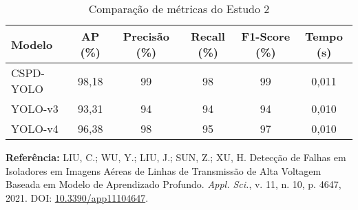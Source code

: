 \begin{table}[h]
    \centering
    \caption{Comparação de métricas do Estudo 2}
    \begin{tabular}{lccccc}
        \hline
        \textbf{Modelo} & \textbf{AP (\%)} & \textbf{Precisão (\%)} & \textbf{Recall (\%)} & \textbf{F1-Score (\%)} & \textbf{Tempo (s)} \\
        \hline
        CSPD-YOLO & 98,18 & 99 & 98 & 99 & 0,011 \\
        YOLO-v3 & 93,31 & 94 & 94 & 94 & 0,010 \\
        YOLO-v4 & 96,38 & 98 & 95 & 97 & 0,010 \\
        \hline
    \end{tabular}
\end{table}

\textbf{Referência:} LIU, C.; WU, Y.; LIU, J.; SUN, Z.; XU, H. Detecção de Falhas em Isoladores em Imagens Aéreas de Linhas de Transmissão de Alta Voltagem Baseada em Modelo de Aprendizado Profundo. \textit{Appl. Sci.}, v. 11, n. 10, p. 4647, 2021. DOI: \href{https://doi.org/10.3390/app11104647}{10.3390/app11104647}.

